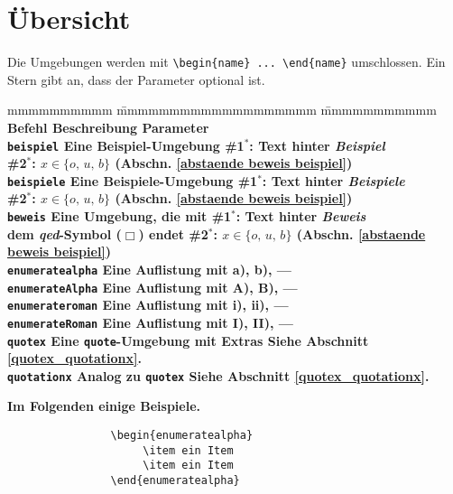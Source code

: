 		\section{Übersicht}
			Die Umgebungen werden mit \verb|\begin{name} ... \end{name}| umschlossen. Ein Stern gibt an, dass der Parameter optional ist.
			\begin{tabbing}
				mmmmmmmmmm				\= mmmmmmmmmmmmmmmmmmm					\= mmmmmmmmmmm									\kill
				\bf Befehl				\> \bf Beschreibung						\> \bf Parameter 								\\
				\verb|beispiel|			\> Eine \textbf{Beispiel}-Umgebung 		\> \#1${}^*$: Text hinter \emph{Beispiel} 		\\
										\>										\> \#2${}^*$: $x \in \{o, \, u, \, b\}$ (Abschn. \ref{abstaende beweis beispiel}) \\	
				\verb|beispiele|		\> Eine \textbf{Beispiele}-Umgebung 	\> \#1${}^*$: Text hinter \emph{Beispiele} 	\\
										\>										\> \#2${}^*$: $x \in \{o, \, u, \, b\}$ (Abschn. \ref{abstaende beweis beispiel}) \\	
				\verb|beweis|			\> Eine Umgebung, die mit 				\> \#1${}^*$: Text hinter \emph{Beweis}		\\
										\> dem \emph{qed}-Symbol ($\Box$) endet	\> \#2${}^*$: $x \in \{o, \, u, \, b\}$ (Abschn. \ref{abstaende beweis beispiel})		\\
				\verb|enumeratealpha|	\> Eine Auflistung mit a), b), \ellipse	\> ---											\\
				\verb|enumerateAlpha|	\> Eine Auflistung mit A), B), \ellipse \> ---											\\
				\verb|enumerateroman|	\> Eine Auflistung mit i), ii), \ellipse\> ---											\\
				\verb|enumerateRoman|	\> Eine Auflistung mit I), II), \ellipse\> ---											\\
				\verb|quotex|			\> Eine \texttt{quote}-Umgebung mit Extras
																		\> Siehe Abschnitt \ref{quotex_quotationx}.			\\
				\verb|quotationx|		\>	Analog zu \texttt{quotex}	\> Siehe Abschnitt \ref{quotex_quotationx}.
			\end{tabbing}
			
			\noindent \textbf{Im Folgenden einige Beispiele.}
			
			\begin{verbatim}
				\begin{enumeratealpha} 
				     \item ein Item 
				     \item ein Item 
				\end{enumeratealpha}
			\end{verbatim}
			
